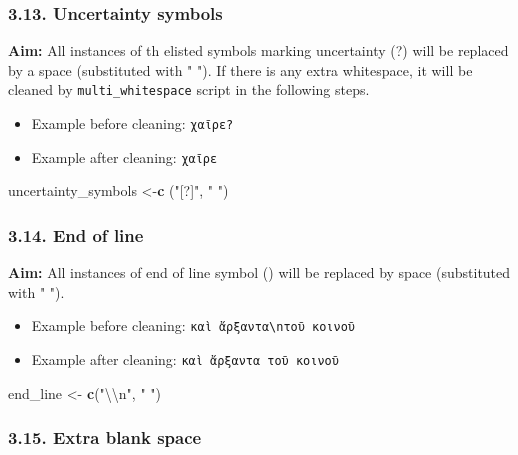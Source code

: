 \documentclass[]{article}
\newenvironment{Shaded}{\begin{snugshade}}{\end{snugshade}}
\newcommand{\CharTok}[1]{\textcolor[rgb]{0.31,0.60,0.02}{#1}}
\newcommand{\KeywordTok}[1]{\textcolor[rgb]{0.13,0.29,0.53}{\textbf{#1}}}
\newcommand{\NormalTok}[1]{#1}
\newcommand{\StringTok}[1]{\textcolor[rgb]{0.31,0.60,0.02}{#1}}
\providecommand{\tightlist}{%
  \setlength{\itemsep}{0pt}\setlength{\parskip}{0pt}}
\begin{document}
\hypertarget{uncertainty-symbols}{%
\subsubsection{3.13. Uncertainty symbols}\label{uncertainty-symbols}}

\textbf{Aim:} All instances of th elisted symbols marking uncertainty
(?) will be replaced by a space (substituted with " "). If there is any
extra whitespace, it will be cleaned by \texttt{multi\_whitespace}
script in the following steps.

\begin{itemize}
\tightlist
\item
  Example before cleaning: \texttt{χαῖρε?}
\item
  Example after cleaning: \texttt{χαῖρε}
\end{itemize}

\begin{Shaded}
\begin{Highlighting}[]
\NormalTok{uncertainty_symbols <-}\KeywordTok{c}\NormalTok{ (}\StringTok{"[?]"}\NormalTok{, }\StringTok{" "}\NormalTok{)}
\end{Highlighting}
\end{Shaded}

\hypertarget{end-of-line}{%
\subsubsection{3.14. End of line}\label{end-of-line}}

\textbf{Aim:} All instances of end of line symbol (\n) will be replaced
by space (substituted with " ").

\begin{itemize}
\tightlist
\item
  Example before cleaning:
  \texttt{καὶ\ ἄρξαντα\textbackslash{}nτοῦ\ κοινοῦ}
\item
  Example after cleaning: \texttt{καὶ\ ἄρξαντα\ τοῦ\ κοινοῦ}
\end{itemize}

\begin{Shaded}
\begin{Highlighting}[]
\NormalTok{end_line <-}\StringTok{ }\KeywordTok{c}\NormalTok{(}\StringTok{"}\CharTok{\textbackslash{}\textbackslash{}}\StringTok{n"}\NormalTok{, }\StringTok{" "}\NormalTok{)}
\end{Highlighting}
\end{Shaded}

\hypertarget{extra-blank-space}{%
\subsubsection{3.15. Extra blank space}\label{extra-blank-space}}
\end{document}
